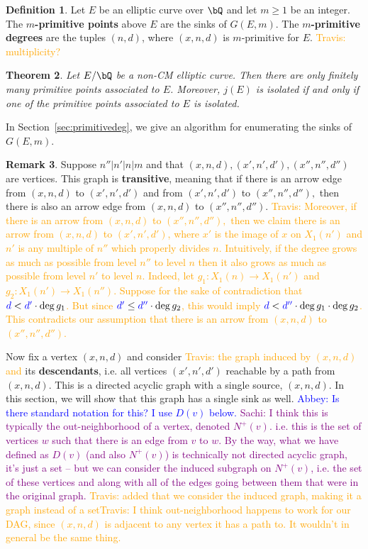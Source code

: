 \documentclass[11pt,reqno]{amsart}
\theoremstyle{plain}
\newtheorem{theorem}{Theorem}%
\theoremstyle{definition}
\newtheorem{remark}[theorem]{Remark}
\newtheorem{definition}[theorem]{Definition}
\newcommand{\Q}{\bQ}
\newcommand{\abbey}[1]{\textcolor{blue}{Abbey: #1}}
\newcommand{\sachi}[1]{\textcolor{purple}{Sachi: #1}}
\newcommand{\travis}[1]{\textcolor{orange}{Travis: #1}}
\newcommand{\abedit}[1]{{\color{blue} #1}}
\newcommand{\sedit}[1]{{\color{purple} #1}}
\begin{document}
\begin{definition}\label{def:mprimitive}
    Let $E$ be an elliptic curve over $\Q$ and let $m\geq 1$ be an integer. The \textbf{$m$-primitive points} above $E$ are the sinks \abedit{of} $G(E,m)$. The \textbf{$m$-primitive degrees} are the tuples $(n,d)$, where $(x,n,d)$ is $m$-primitive for $E$. \travis{multiplicity?}
\end{definition}

\abedit{
\begin{theorem}
    Let $E/\Q$ be a non-CM elliptic curve. Then there are only finitely many primitive points associated to $E$. Moreover, $j(E)$ is isolated if and only if one of the primitive points associated to $E$ is isolated.
\end{theorem}

}
In Section~\ref{sec:primitivedeg}, we give an algorithm for enumerating the sinks of $G(E,m)$. 
\begin{remark}\label{Remark:Transitivity}
Suppose $n'' | n' | n | m$ and that $(x,n,d), (x',n',d'), (x'',n'',d'')$ are vertices. This graph is \textbf{transitive}, meaning that if there is an arrow \sedit{edge} from $(x,n,d)$ \sedit{to} $(x',n',d')$ and from $(x',n',d')$ to $(x'',n'',d''),$ then 
there is also an arrow \sedit{edge} from $(x,n,d)$ to $(x'',n'',d'')$. \travis{Moreover, if there is an arrow from $(x,n,d)$ to $(x'',n'',d''),$ then we  claim there \abedit{is} an arrow from $(x,n,d)$ to $(x',n',d')$, \abedit{where $x'$ is the image of $x$ on $X_1(n')$ and $n'$ is any multiple of $n''$ which properly divides $n$}. Intuitively, if the degree grows as much as possible from level $n''$ to level $n$ then it also grows as much as possible from level $n'$ to level $n$. Indeed, let $g_1:X_1(n) \rightarrow X_1(n')$ and $g_2:X_1(n') \rightarrow X_1(n'')$. Suppose for the sake of contradiction that  $\abedit{d}<\abedit{d'}\cdot\deg g_1$. But since $\abedit{d'} \leq \abedit{d''} \cdot \deg g_2$, this would imply $\abedit{d}<\abedit{d''} \cdot\deg g_1\cdot \deg g_2 $. This contradicts our assumption that there is an arrow from $(x,n,d)$ to $(x'',n'',d'')$.}    
\end{remark}


Now fix a vertex $(x,n,d)$ and consider \travis{the graph induced by $(x,n,d)$ and} its \textbf{descendants}, i.e. all vertices $(x',n',d')$ reachable by a path from $(x,n,d)$. This is a directed acyclic graph with a single source, $(x,n,d)$.  \abedit{In this section, we will show that this graph has a single sink as well.}    \abbey{Is there standard notation for this? I use $D(v)$ below.} \sachi{I think this is typically the out-neighborhood of a vertex, denoted $N^+(v)$. i.e. this is the set of vertices $w$ such that there is an edge from $v$ to $w$. By the way, what we have defined as $D(v)$ (and also $N^+(v)$) is technically not directed acyclic graph, it's just a set -- but we can consider the induced subgraph on $N^+(v)$, i.e. the set of these vertices and along with all of the edges going between them that were in the original graph.} \travis{added that we consider the induced graph, making it a graph instead of a set}\travis{I think out-neighborhood happens to work for our DAG, since $(x,n,d)$ is adjacent to any vertex it has a path to. It wouldn't in general be the same thing.}
\end{document}
